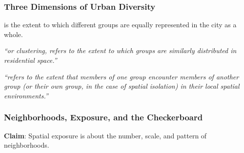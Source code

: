 \documentclass{beamer}
\begin{document}
	\begin{frame}\frametitle{Three Dimensions of Urban Diversity}
	
		\begin{description}[<+ ->]
			\item[\alert<1>{Global diversity}] is the extent to which different groups are equally represented in the city as a whole.  
			\item[\alert<2>{Spatial evenness}] \textit{``or clustering, refers to the extent to which groups are similarly distributed in residential space.''} \cite{Reardon2004}
			\item[\alert<3>{Spatial exposure}] \textit{``refers to the extent that members of one group encounter members of another group (or their own group, in the case of spatial isolation) in their local spatial environments.''} \cite{Reardon2004} 
			
		\end{description}
		

	\end{frame}
	\begin{frame}[t]\frametitle{Neighborhoods, Exposure, and the Checkerboard}
	    \textbf{Claim}: Spatial exposure is about the number, scale, and pattern of neighborhoods.
	    \begin{figure}
	    	\centering

	    \end{figure}
	    
	\end{frame}
\end{document}
